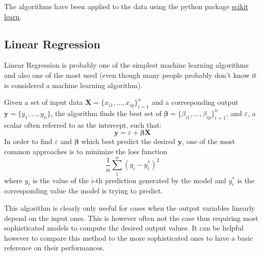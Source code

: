 The algorithms have been applied to the data using the python package \href{https://scikit-learn.org/}{scikit learn}.
\subsection{Linear Regression}\label{linearregr}
Linear Regression is probably one of the simplest machine learning algorithms and also one of the most used (even though many people probably don't know it is considered a machine learning algorithm).

Given a set of input data $\bm{X} = \{x_{i1},\ldots ,x_{ip}\}_{i=1}^{n}$ and a corresponding output $\mathbf{y} = \{y_{1},\ldots ,y_{n}\}$, the algorithm finds the best set of $\bm{\beta} = \{\beta_{i1},\ldots ,\beta_{ip}\}_{i=1}^{n}$, and $\varepsilon$, a scalar often referred to as the intercept, such that:
\begin{equation}\label{eq:linear}
\mathbf {y} = \varepsilon + \bm{\beta}\bm{X}
\end{equation}
In order to find $\varepsilon$ and $\bm{\beta}$ which best predict the desired $\mathbf {y}$, one of the most common approaches is to minimize the loss function
\begin{equation}
\frac{1}{n}\sum_{1}^{n}(y_i-y^*_i)^2
\end{equation}
where $y_i$ is the value of the $i$-th prediction generated by the model and $y^*_i$ is the corresponding value the model is trying to predict.

This algorithm is clearly only useful for cases when the output variables linearly depend on the input ones. This is however often not the case thus requiring most sophisticated models to compute the desired output values. It can be helpful however to compare this method to the more sophisticated ones to have a basic reference on their performances.

